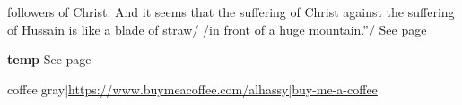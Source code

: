 \documentclass[11pt]{article}
\begin{document}
followers of Christ. And it seems that the suffering of Christ against the suffering of Hussain is like a blade of straw/ /in front of a huge mountain.”/ See page \pageref{org-special-block-extras-glossary-declaration-site-Hussain}

\vspace{1em}\textbf{temp}\quad\label{org-special-block-extras-glossary-temp} See page \pageref{org-special-block-extras-glossary-declaration-site-temp}



 coffee|gray|\url{https://www.buymeacoffee.com/alhassy|buy-me-a-coffee}
\end{document}
